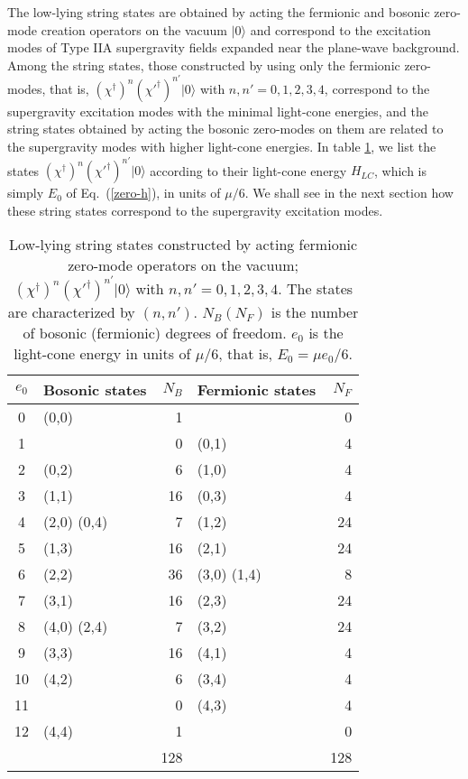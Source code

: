 \documentclass[a4paper,12pt]{article}
\numberwithin{equation}{section}
\begin{document}
The low-lying string states are obtained by acting the fermionic and
bosonic zero-mode creation operators on the vacuum $| 0 \rangle$ and
correspond to the excitation modes of Type IIA supergravity fields
expanded near the plane-wave background.  Among the string states,
those constructed by using only the fermionic zero-modes, that is,
$(\chi^\dagger)^n (\chi'^\dagger)^{n'} |0 \rangle $ with $n,n' =
0,1,2,3,4$, correspond to the supergravity excitation modes with the
minimal light-cone energies, and the string states obtained by acting
the bosonic zero-modes on them are related to the supergravity modes
with higher light-cone energies.  In table \ref{string-states}, we
list the states $(\chi^\dagger)^n (\chi'^\dagger)^{n'} |0 \rangle $
according to their light-cone energy $H_{LC}$, which is simply $E_0$
of Eq.~(\ref{zero-h}), in units of $\mu / 6$.  We shall see in the
next section how these string states correspond to the supergravity
excitation modes.

\begin{table}
\begin{center}
\begin{tabular}{|c|lr|lr|}
\hline
$e_0$ &   Bosonic states & $N_B$ & Fermionic states & $N_F$ \\
\hline
0   & (0,0)            & 1       &                  & 0     \\
1   &                  & 0       & (0,1)            & 4     \\
2   & (0,2)            & 6       & (1,0)            & 4     \\
3   & (1,1)            & 16      & (0,3)            & 4     \\
4   & (2,0) (0,4)      & 7       & (1,2)            & 24    \\
5   & (1,3)            & 16      & (2,1)            & 24    \\
6   & (2,2)            & 36      & (3,0) (1,4)      & 8     \\
7   & (3,1)            & 16      & (2,3)            & 24    \\
8   & (4,0) (2,4)      & 7       & (3,2)            & 24    \\
9   & (3,3)            & 16      & (4,1)            & 4     \\
10  & (4,2)            & 6       & (3,4)            & 4     \\
11  &                  & 0       & (4,3)            & 4     \\
12  & (4,4)            & 1       &                  & 0     \\
\hline
    &                  & 128     &                  & 128   \\
\hline
\end{tabular}
\end{center}
\caption{Low-lying string states constructed by acting fermionic
zero-mode operators on the vacuum; $(\chi^\dagger)^n
(\chi'^\dagger)^{n'} |0 \rangle $ with $n,n' = 0,1,2,3,4$. The
states are characterized by $(n,n')$. $N_B(N_F)$ is the
number of bosonic (fermionic) degrees of freedom. $e_0$ is
the light-cone energy in units of $\mu / 6$, that is,
$E_0 = \mu e_0 /6$.}\label{string-states}
\end{table}
\end{document}
